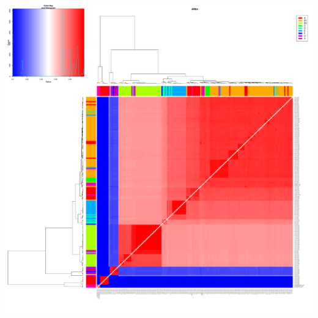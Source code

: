 \begin{frame}
\begin{columns}[T]
\begin{column}{5cm}
      \includegraphics[width=1\textwidth]{images/ANIm_Ecoli}
    \end{column}
  \end{columns}       
\end{frame}